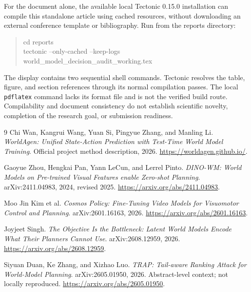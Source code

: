 \documentclass[11pt]{article}
\begin{document}
For the document alone, the available local Tectonic 0.15.0 installation can
compile this standalone article using cached resources, without downloading
an external conference template or bibliography. Run from the reports directory:
\begin{quote}\small\ttfamily
cd reports\\
tectonic --only-cached --keep-logs world\_model\_decision\_audit\_working.tex
\end{quote}
The display contains two sequential shell commands. Tectonic resolves the table, figure,
and section references through its normal compilation passes. The local
\texttt{pdflatex} command lacks its format file and is not the verified build
route. Compilability and document consistency do not establish
scientific novelty, completion of the research goal, or submission readiness.

\begin{thebibliography}{9}
Chi Wan, Kangrui Wang, Yuan Si, Pingyue Zhang, and Manling Li.
\emph{WorldAgen: Unified State-Action Prediction with Test-Time World Model
Training}. Official project method description, 2026.
\url{https://worldagen.github.io/}.

Gaoyue Zhou, Hengkai Pan, Yann LeCun, and Lerrel Pinto.
\emph{DINO-WM: World Models on Pre-trained Visual Features enable Zero-shot
Planning}. arXiv:2411.04983, 2024, revised 2025.
\url{https://arxiv.org/abs/2411.04983}.

Moo Jin Kim et al.
\emph{Cosmos Policy: Fine-Tuning Video Models for Visuomotor Control and Planning}.
arXiv:2601.16163, 2026.
\url{https://arxiv.org/abs/2601.16163}.

Joyjeet Singh.
\emph{The Objective Is the Bottleneck: Latent World Models Encode What Their
Planners Cannot Use}. arXiv:2608.12959, 2026.
\url{https://arxiv.org/abs/2608.12959}.

Siyuan Duan, Ke Zhang, and Xizhao Luo.
\emph{TRAP: Tail-aware Ranking Attack for World-Model Planning}.
arXiv:2605.01950, 2026. Abstract-level context; not locally reproduced.
\url{https://arxiv.org/abs/2605.01950}.
\end{thebibliography}
\end{document}
